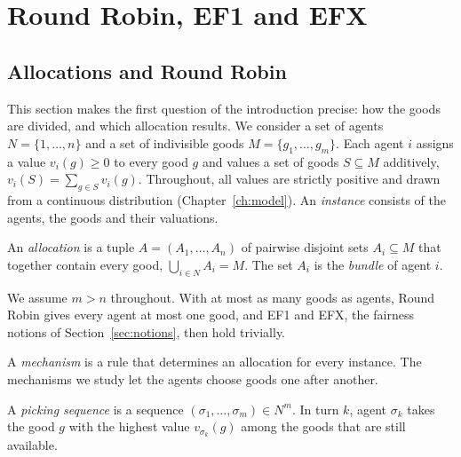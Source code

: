 \chapter{Round Robin, EF1 and EFX}\label{ch:background}




\section{Allocations and Round Robin}\label{sec:setting}

This section makes the first question of the introduction precise: how the goods are divided, and
which allocation results. We consider a set of agents $N=\{1,\dots,n\}$ and a set of indivisible
goods $M=\{g_1,\dots,g_m\}$. Each agent $i$ assigns a value $v_i(g)\geq0$ to every good $g$ and
values a set of goods $S\subseteq M$ additively, $v_i(S)=\sum_{g\in S}v_i(g)$. Throughout, all values are
strictly positive and drawn from a continuous distribution (Chapter~\ref{ch:model}). An \textit{instance} consists of the agents, the goods and their
valuations.

\begin{definition}[Allocation]
An \textit{allocation} is a tuple $A=(A_1,\dots,A_n)$ of pairwise disjoint sets $A_i\subseteq M$
that together contain every good, $\bigcup_{i\in N}A_i=M$. The set $A_i$ is the \textit{bundle} of
agent $i$.
\end{definition}

We assume $m>n$ throughout. With at most as many goods as agents, Round Robin gives every agent at
most one good, and EF1 and EFX, the fairness notions of Section~\ref{sec:notions}, then hold
trivially.

A \textit{mechanism} is a rule that determines an allocation for every instance. The mechanisms we
study let the agents choose goods one after another.

\begin{definition}
A \textit{picking sequence} is a sequence $(\sigma_1,\dots,\sigma_m)\in N^m$. In turn $k$, agent
$\sigma_k$ takes the good $g$ with the highest value $v_{\sigma_k}(g)$ among the goods that are
still available.
\end{definition}

